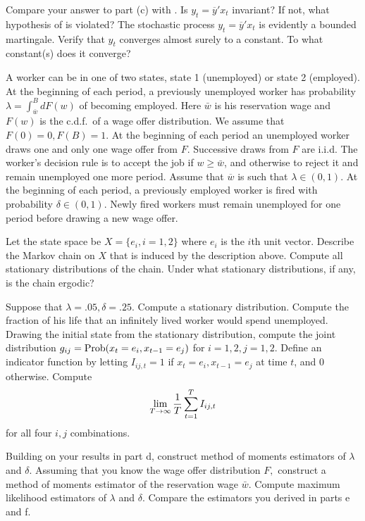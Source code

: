 \medskip{}
Compare your answer to part (c) with . Is $y_t =
\overline y'x_t$ invariant?  If not, what  hypothesis of
 is violated?
\medskip
{}  The stochastic process $y_t  = \overline y'x_t$
is evidently a bounded martingale.  Verify that $y_t$ converges almost
surely to a constant.  To what constant(s) does it converge?




\medskip
{} %
\medskip
\noindent
A worker can be in one of two states, state 1 (unemployed) or state
2 (employed).
At the beginning of each period,
a previously  unemployed worker has probability $\lambda = \int_{\bar w}^B d F(w)$
of  becoming employed.  Here $\bar w$ is his reservation wage
and $F(w)$ is the c.d.f.\ of     a wage offer distribution. We assume
that $F(0)=0, F(B)=1$. At the
beginning of each period an unemployed worker draws one and only one wage
offer from $F$. Successive draws from $F$ are i.i.d.
The worker's decision rule is to accept the job if $w \geq \bar w$,
and otherwise to reject it   and remain unemployed one more period.
Assume that $\overline w$ is such that $\lambda \in (0,1)$.
At the beginning of each period, a previously employed worker is fired
with probability $\delta \in (0,1)$. Newly fired workers must remain unemployed
for one period before drawing a new wage offer.

\medskip
{}  Let the state space be $X = \{e_i, i=1,2\}$ where
$e_i$ is the $i$th unit vector. Describe the Markov chain on $X$
that is induced by the description above.
Compute all stationary distributions of the chain.
Under what stationary distributions, if any, is the chain ergodic?

\medskip
{}   Suppose that $\lambda = .05, \delta  =.25$.  Compute
a stationary  distribution.  Compute the fraction of his life that
an infinitely lived worker would spend
unemployed.
\medskip
{}   Drawing the initial state from the
stationary distribution, compute the joint distribution
$ g_{ij} = {\rm Prob}(x_t = e_i, x_{t-1} =e_j) $ for $i=1,2, j=1,2$.
\medskip
{}  Define an indicator function by  letting
$I_{ij, t} = 1$ if $x_t = e_i, x_{t-1} = e_j$
at time $t$, and $0$ otherwise.
Compute
$$ \lim_{T \rightarrow \infty} {1 \over T} \sum_{t=1}^T I_{ij,t}$$
for all four $i,j$ combinations.

\medskip
{}  Building on your results in  part d, construct
method of moments estimators of
$\lambda$  and $\delta$.
Assuming that you know the wage offer distribution $F,$
construct a method of moments estimator of  the reservation wage
$\bar w$.
\medskip
{}  Compute maximum likelihood estimators of
$\lambda$ and $\delta$.
\medskip
{}  Compare   the estimators you derived in
parts e and f.

